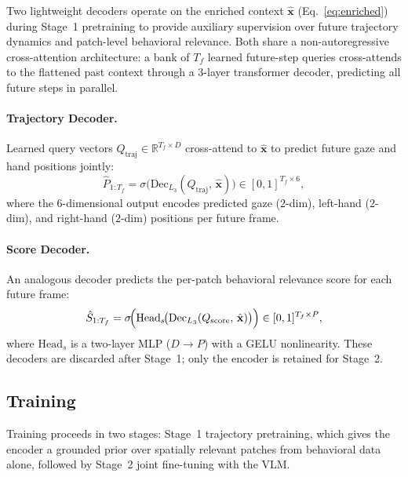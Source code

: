 Two lightweight decoders operate on the enriched context $\hat{\mathbf{x}}$
(Eq.~\eqref{eq:enriched}) during Stage~1 pretraining to provide auxiliary
supervision over future trajectory dynamics and patch-level behavioral relevance.
Both share a non-autoregressive cross-attention architecture: a bank of
$T_f$ learned future-step queries cross-attends to the flattened past context
through a 3-layer transformer decoder, predicting all future steps in parallel.

\paragraph{Trajectory Decoder.}
Learned query vectors $Q_{\mathrm{traj}} \in \mathbb{R}^{T_f \times D}$
cross-attend to $\hat{\mathbf{x}}$ to predict future gaze and hand positions jointly:
\begin{equation}
    \hat{P}_{1:T_f} = \sigma\!\bigl(
        \mathrm{Dec}_{L_3}(Q_{\mathrm{traj}},\, \hat{\mathbf{x}})
    \bigr) \in [0,1]^{T_f \times 6},
\end{equation}
where the 6-dimensional output encodes predicted gaze ($2$-dim),
left-hand ($2$-dim), and right-hand ($2$-dim) positions per future frame.

\paragraph{Score Decoder.}
An analogous decoder predicts the per-patch behavioral relevance score for each
future frame:
\begin{equation}
    \hat{S}_{1:T_f} = \sigma\!\Bigl(
        \mathrm{Head}_s\!\bigl(
            \mathrm{Dec}_{L_3}(Q_{\mathrm{score}},\, \hat{\mathbf{x}})
        \bigr)
    \Bigr) \in [0,1]^{T_f \times P},
\end{equation}
where $\mathrm{Head}_s$ is a two-layer MLP ($D \to P$) with a GELU nonlinearity.
These decoders are discarded after Stage~1; only the encoder is retained for Stage~2.


\subsection{Training}
\label{sec:training}

Training proceeds in two stages: Stage~1 trajectory pretraining, which gives the
encoder a grounded prior over spatially relevant patches from behavioral data alone,
followed by Stage~2 joint fine-tuning with the VLM.

